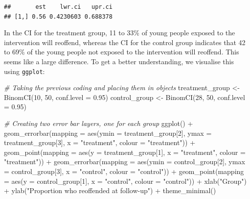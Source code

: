 \documentclass[
]{book}
\newenvironment{Shaded}{\begin{snugshade}}{\end{snugshade}}
\newcommand{\AttributeTok}[1]{\textcolor[rgb]{0.77,0.63,0.00}{#1}}
\newcommand{\CommentTok}[1]{\textcolor[rgb]{0.56,0.35,0.01}{\textit{#1}}}
\newcommand{\DecValTok}[1]{\textcolor[rgb]{0.00,0.00,0.81}{#1}}
\newcommand{\FloatTok}[1]{\textcolor[rgb]{0.00,0.00,0.81}{#1}}
\newcommand{\FunctionTok}[1]{\textcolor[rgb]{0.00,0.00,0.00}{#1}}
\newcommand{\NormalTok}[1]{#1}
\newcommand{\OtherTok}[1]{\textcolor[rgb]{0.56,0.35,0.01}{#1}}
\newcommand{\SpecialCharTok}[1]{\textcolor[rgb]{0.00,0.00,0.00}{#1}}
\newcommand{\StringTok}[1]{\textcolor[rgb]{0.31,0.60,0.02}{#1}}
\begin{document}
\begin{verbatim}
##       est    lwr.ci   upr.ci
## [1,] 0.56 0.4230603 0.688378
\end{verbatim}

In the CI for the treatment group, 11 to 33\% of young people exposed to the intervention will reoffend, whereas the CI for the control group indicates that 42 to 69\% of the young people not exposed to the intervention will reoffend. This seems like a large difference. To get a better understanding, we visualise this using \texttt{ggplot}:

\begin{Shaded}
\begin{Highlighting}[]
\CommentTok{\# Taking the previous coding and placing them in objects}
\NormalTok{treatment\_group }\OtherTok{\textless{}{-}} \FunctionTok{BinomCI}\NormalTok{(}\DecValTok{10}\NormalTok{, }\DecValTok{50}\NormalTok{, }\AttributeTok{conf.level =} \FloatTok{0.95}\NormalTok{) }
\NormalTok{control\_group }\OtherTok{\textless{}{-}} \FunctionTok{BinomCI}\NormalTok{(}\DecValTok{28}\NormalTok{, }\DecValTok{50}\NormalTok{, }\AttributeTok{conf.level =} \FloatTok{0.95}\NormalTok{)}

\CommentTok{\# Creating two error bar layers, one for each group}
\FunctionTok{ggplot}\NormalTok{() }\SpecialCharTok{+} 
  \FunctionTok{geom\_errorbar}\NormalTok{(}\AttributeTok{mapping =} \FunctionTok{aes}\NormalTok{(}\AttributeTok{ymin =}\NormalTok{ treatment\_group[}\DecValTok{2}\NormalTok{], }\AttributeTok{ymax =}\NormalTok{ treatment\_group[}\DecValTok{3}\NormalTok{], }\AttributeTok{x =} \StringTok{"treatment"}\NormalTok{, }\AttributeTok{colour =} \StringTok{"treatment"}\NormalTok{)) }\SpecialCharTok{+} 
  \FunctionTok{geom\_point}\NormalTok{(}\AttributeTok{mapping =} \FunctionTok{aes}\NormalTok{(}\AttributeTok{y =}\NormalTok{ treatment\_group[}\DecValTok{1}\NormalTok{], }\AttributeTok{x =} \StringTok{"treatment"}\NormalTok{, }\AttributeTok{colour =} \StringTok{"treatment"}\NormalTok{)) }\SpecialCharTok{+} \FunctionTok{geom\_errorbar}\NormalTok{(}\AttributeTok{mapping =} \FunctionTok{aes}\NormalTok{(}\AttributeTok{ymin =}\NormalTok{ control\_group[}\DecValTok{2}\NormalTok{], }\AttributeTok{ymax =}\NormalTok{ control\_group[}\DecValTok{3}\NormalTok{], }\AttributeTok{x =} \StringTok{"control"}\NormalTok{, }\AttributeTok{colour =} \StringTok{"control"}\NormalTok{)) }\SpecialCharTok{+} 
  \FunctionTok{geom\_point}\NormalTok{(}\AttributeTok{mapping =} \FunctionTok{aes}\NormalTok{(}\AttributeTok{y =}\NormalTok{ control\_group[}\DecValTok{1}\NormalTok{], }\AttributeTok{x =} \StringTok{"control"}\NormalTok{, }\AttributeTok{colour =} \StringTok{"control"}\NormalTok{)) }\SpecialCharTok{+}
  \FunctionTok{xlab}\NormalTok{(}\StringTok{"Group"}\NormalTok{) }\SpecialCharTok{+}
  \FunctionTok{ylab}\NormalTok{(}\StringTok{"Proportion who reoffended at follow{-}up"}\NormalTok{) }\SpecialCharTok{+} 
  \FunctionTok{theme\_minimal}\NormalTok{()}
\end{Highlighting}
\end{Shaded}
\end{document}
